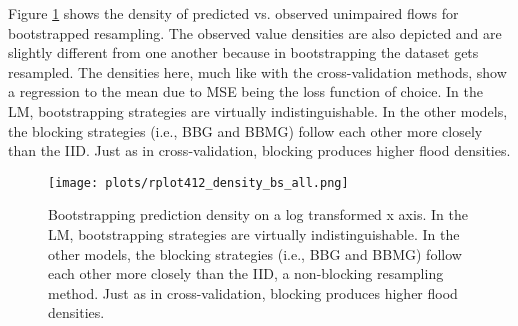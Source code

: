 Figure \ref{fig:modelscvdensity_bs} shows the density of predicted vs. observed unimpaired flows for bootstrapped resampling. The observed value densities are also depicted and are slightly different from one another because in bootstrapping the dataset gets resampled. The densities here, much like with the cross-validation methods, show a regression to the mean due to MSE being the loss function of choice. In the LM, bootstrapping strategies are virtually indistinguishable. In the other models, the blocking strategies (i.e., BBG and BBMG) follow each other more closely than the IID. Just as in cross-validation, blocking produces higher flood densities.

\begin{figure}
  	\centering
 	\texttt{[image: plots/rplot412\_density\_bs\_all.png]}
	\caption[Bootstrapping prediction density on a log transformed x axis.]{Bootstrapping prediction density on a log transformed x axis. In the LM, bootstrapping strategies are virtually indistinguishable. In the other models, the blocking strategies (i.e., BBG and BBMG) follow each other more closely than the IID, a non-blocking resampling method. Just as in cross-validation, blocking produces higher flood densities.}
	\label{fig:modelscvdensity_bs}
\end{figure}

